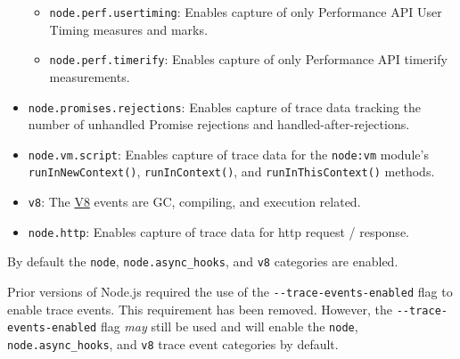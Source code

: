 \begin{itemize}
  \begin{itemize}
  \tightlist
  \item
    \texttt{node.perf.usertiming}: Enables capture of only Performance
    API User Timing measures and marks.
  \item
    \texttt{node.perf.timerify}: Enables capture of only Performance API
    timerify measurements.
  \end{itemize}
\item
  \texttt{node.promises.rejections}: Enables capture of trace data
  tracking the number of unhandled Promise rejections and
  handled-after-rejections.
\item
  \texttt{node.vm.script}: Enables capture of trace data for the
  \texttt{node:vm} module's \texttt{runInNewContext()},
  \texttt{runInContext()}, and \texttt{runInThisContext()} methods.
\item
  \texttt{v8}: The \href{v8.md}{V8} events are GC, compiling, and
  execution related.
\item
  \texttt{node.http}: Enables capture of trace data for http request /
  response.
\end{itemize}

By default the \texttt{node}, \texttt{node.async\_hooks}, and
\texttt{v8} categories are enabled.

\begin{Shaded}
\begin{Highlighting}[]
 
\end{Highlighting}
\end{Shaded}

Prior versions of Node.js required the use of the
\texttt{-\/-trace-events-enabled} flag to enable trace events. This
requirement has been removed. However, the
\texttt{-\/-trace-events-enabled} flag \emph{may} still be used and will
enable the \texttt{node}, \texttt{node.async\_hooks}, and \texttt{v8}
trace event categories by default.

\begin{Shaded}
\begin{Highlighting}[]
 


 
\end{Highlighting}
\end{Shaded}

